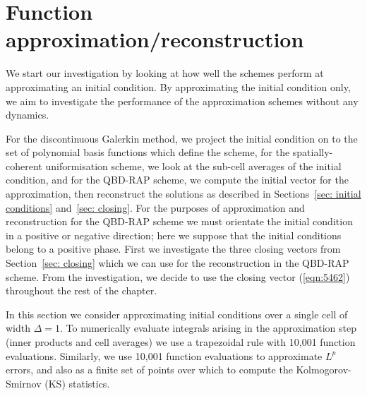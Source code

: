 


	




\section{Function approximation/reconstruction}\label{sec: recon num}
We start our investigation by looking at how well the schemes perform at approximating an initial condition. By approximating the initial condition only, we aim to investigate the performance of the approximation schemes without any dynamics.

For the discontinuous Galerkin method, we project the initial condition on to the set of polynomial basis functions which define the scheme, for the spatially-coherent uniformisation scheme, we look at the sub-cell averages of the initial condition, and for the QBD-RAP scheme, we compute the initial vector for the approximation, then reconstruct the solutions as described in Sections~\ref{sec: initial conditions} and~\ref{sec: closing}. For the purposes of approximation and reconstruction for the QBD-RAP scheme we must orientate the initial condition in a positive or negative direction; here we suppose that the initial conditions belong to a positive phase. First we investigate the three closing vectors from Section~\ref{sec: closing} which we can use for the reconstruction in the QBD-RAP scheme. From the investigation, we decide to use the closing vector (\ref{eqn:5462}) throughout the rest of the chapter.

In this section we consider approximating initial conditions over a single cell of width \(\Delta = 1\). To numerically evaluate integrals arising in the approximation step (inner products and cell averages) we use a trapezoidal rule with 10,001 function evaluations. Similarly, we use 10,001 function evaluations to approximate \(L^p\) errors, and also as a finite set of points over which to compute the Kolmogorov-Smirnov (KS) statistics. 

